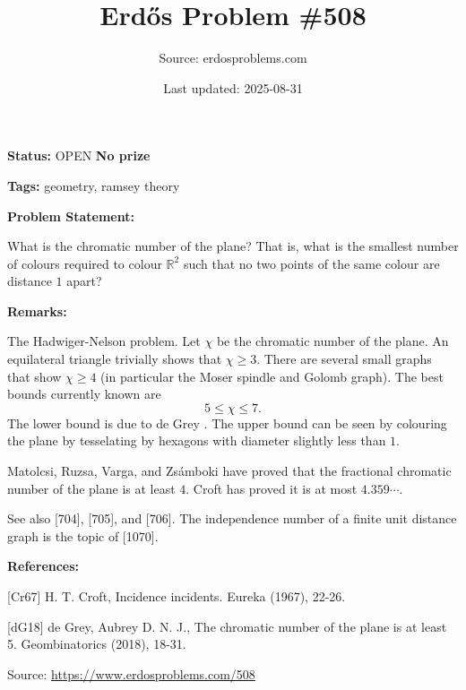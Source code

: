 \documentclass{article}
\title{Erd\H{o}s Problem \#508}
\date{Last updated: 2025-08-31}
\author{Source: erdosproblems.com}
\begin{document}
\maketitle

\noindent\textbf{Status:} OPEN \quad \textbf{No prize}

\noindent\textbf{Tags:} geometry, ramsey theory

\medskip
\noindent\textbf{Problem Statement:}

What is the chromatic number of the plane? That is, what is the smallest number of colours required to colour $\mathbb{R}^2$ such that no two points of the same colour are distance $1$ apart?

\bigskip
\noindent\textbf{Remarks:}

The Hadwiger-Nelson problem. Let $\chi$ be the chromatic number of the plane. An equilateral triangle trivially shows that $\chi\geq 3$. There are several small graphs that show $\chi\geq 4$ (in particular the Moser spindle and Golomb graph). The best bounds currently known are\[5 \leq \chi \leq 7.\]The lower bound is due to de Grey \cite{dG18}. The upper bound can be seen by colouring the plane by tesselating by hexagons with diameter slightly less than $1$.

Matolcsi, Ruzsa, Varga, and Zs\'{a}mboki have proved that the fractional chromatic number of the plane is at least $4$. Croft \cite{Cr67} has proved it is at most $4.359\cdots$.

See also [704], [705], and [706]. The independence number of a finite unit distance graph is the topic of [1070].

\bigskip
\noindent\textbf{References:}

[Cr67] H. T. Croft, Incidence incidents. Eureka (1967), 22-26.
 
 [dG18] de Grey, Aubrey D. N. J., The chromatic number of the plane is at least 5. Geombinatorics (2018), 18-31.

\bigskip
\noindent\small{Source: \url{https://www.erdosproblems.com/508}}
\end{document}
